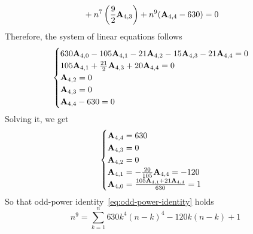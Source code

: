 \begin{example}
\begin{equation*}
\begin{split}
            &+ n^7 \left( \frac{9}{2} {\mathbf{A}} \sb{4,3} \right) + n^9 ({\mathbf{A}} \sb{4,4} - 630) = 0
        \end{split}
    \end{equation*}
    Therefore, the system of linear equations follows
    \begin{equation*}
        \begin{cases}
            630 {\mathbf{A}} \sb{4,0} - 105 {\mathbf{A}} \sb{4,1} - 21 {\mathbf{A}} \sb{4,2} - 15 {\mathbf{A}} \sb{4,3} - 21 {\mathbf{A}} \sb{4,4} = 0 \\
            105 {\mathbf{A}} \sb{4,1} + \frac{21}{2} {\mathbf{A}} \sb{4,3} + 20 {\mathbf{A}} \sb{4,4} = 0 \\
            {\mathbf{A}} \sb{4,2} = 0 \\
            {\mathbf{A}} \sb{4,3} = 0 \\
            {\mathbf{A}} \sb{4,4} - 630 = 0
        \end{cases}
    \end{equation*}
    Solving it, we get
    \begin{equation*}
        \begin{cases}
            {\mathbf{A}} \sb{4,4} = 630 \\
            {\mathbf{A}} \sb{4,3} = 0 \\
            {\mathbf{A}} \sb{4,2} = 0 \\
            {\mathbf{A}} \sb{4,1} = - \frac{20}{105} {\mathbf{A}} \sb{4,4} = -120 \\
            {\mathbf{A}} \sb{4,0} = \frac{105 {\mathbf{A}} \sb{4,1} + 21 {\mathbf{A}} \sb{4,4}}{630} = 1
        \end{cases}
    \end{equation*}
    So that odd-power identity~\eqref{eq:odd-power-identity} holds
    \begin{equation*}
        n^9 = \sum_{k=1}^{n} 630 k^4(n-k)^4 - 120k(n-k) + 1
    \end{equation*}
\end{example}
